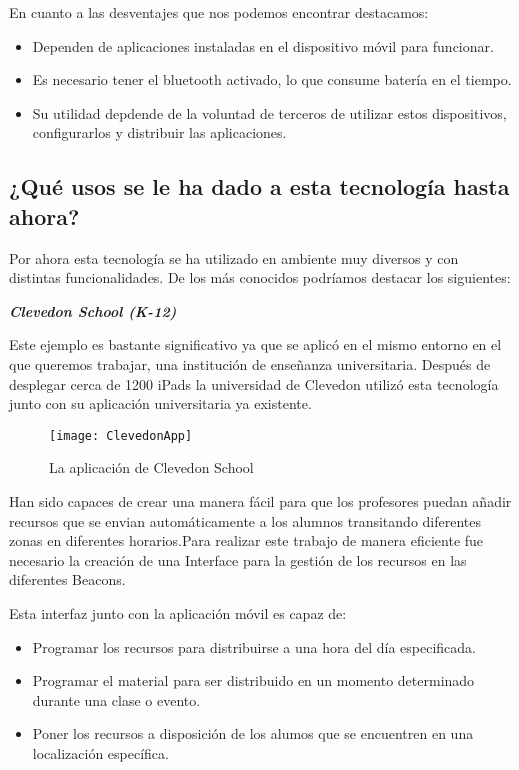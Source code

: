 En cuanto a las desventajes que nos podemos encontrar destacamos:

\begin{itemize}
\item Dependen de aplicaciones instaladas en el dispositivo móvil para funcionar. 
\item Es necesario tener el bluetooth activado, lo que consume batería en el tiempo. 
\item Su utilidad depdende de la voluntad de terceros de utilizar estos dispositivos, configurarlos y distribuir las aplicaciones.
\end{itemize}

\subsection{¿Qué usos se le ha dado a esta tecnología hasta ahora?}

Por ahora esta tecnología se ha utilizado en ambiente muy diversos y con distintas funcionalidades. De los más conocidos podríamos destacar los siguientes: 

\vspace{5mm}

\textsl{\textbf{{Clevedon School (K-12)}}}

\vspace{2mm}

Este ejemplo es bastante significativo ya que se aplicó en el mismo entorno en el que queremos trabajar, una institución de enseñanza universitaria. Después de desplegar cerca de 1200 iPads  la universidad de Clevedon utilizó esta tecnología junto con su aplicación universitaria ya existente. 

\begin{figure}[H]
	\centering
	\texttt{[image: ClevedonApp]}
	\caption{La aplicación de Clevedon School}
	\label{fig:beaconRange}
\end{figure}


Han sido capaces de crear una manera fácil para que los profesores puedan añadir recursos que se envian automáticamente a los alumnos transitando diferentes zonas en diferentes horarios.Para realizar este trabajo de manera eficiente fue necesario la creación de una Interface para la gestión de los recursos en las diferentes Beacons.


Esta interfaz junto con la aplicación móvil es capaz de: 

\begin{itemize}
\item Programar los recursos para distribuirse a una hora del día especificada. 
\item Programar el material para ser distribuido en un momento determinado durante una clase o evento. 
\item Poner los recursos a disposición de los alumos que se encuentren en una localización específica.
\end{itemize}

